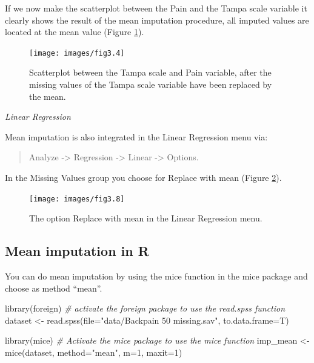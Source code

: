 \documentclass[
]{book}
\newenvironment{Shaded}{\begin{snugshade}}{\end{snugshade}}
\newcommand{\AttributeTok}[1]{\textcolor[rgb]{0.77,0.63,0.00}{#1}}
\newcommand{\CommentTok}[1]{\textcolor[rgb]{0.56,0.35,0.01}{\textit{#1}}}
\newcommand{\DecValTok}[1]{\textcolor[rgb]{0.00,0.00,0.81}{#1}}
\newcommand{\FunctionTok}[1]{\textcolor[rgb]{0.00,0.00,0.00}{#1}}
\newcommand{\NormalTok}[1]{#1}
\newcommand{\OtherTok}[1]{\textcolor[rgb]{0.56,0.35,0.01}{#1}}
\newcommand{\StringTok}[1]{\textcolor[rgb]{0.31,0.60,0.02}{#1}}
\begin{document}
If we now make the scatterplot between the Pain and the Tampa scale variable it clearly shows the result of the mean imputation procedure, all imputed values are located at the mean value (Figure \ref{fig:fig3-4}).

\begin{figure}

{\centering \texttt{[image: images/fig3.4]} 

}

\caption{Scatterplot between the Tampa scale and Pain variable, after the missing values of the Tampa scale variable have been replaced by the mean.}\label{fig:fig3-4}
\end{figure}

\emph{Linear Regression}

Mean imputation is also integrated in the Linear Regression menu via:

\begin{quote}
Analyze -\textgreater{} Regression -\textgreater{} Linear -\textgreater{} Options.
\end{quote}

In the Missing Values group you choose for Replace with mean (Figure \ref{fig:fig3-8}).

\begin{figure}

{\centering \texttt{[image: images/fig3.8]} 

}

\caption{The option Replace with mean in the Linear Regression menu.}\label{fig:fig3-8}
\end{figure}

\hypertarget{mean-imputation-in-r}{%
\subsection{Mean imputation in R}\label{mean-imputation-in-r}}

You can do mean imputation by using the mice function in the mice package and choose as method ``mean''.

\begin{Shaded}
\begin{Highlighting}[]
\FunctionTok{library}\NormalTok{(foreign) }\CommentTok{\# activate the foreign package to use the read.spss function}
\NormalTok{dataset }\OtherTok{\textless{}{-}} \FunctionTok{read.spss}\NormalTok{(}\AttributeTok{file=}\StringTok{"data/Backpain 50 missing.sav"}\NormalTok{, }\AttributeTok{to.data.frame=}\NormalTok{T)}

\FunctionTok{library}\NormalTok{(mice) }\CommentTok{\# Activate the mice package to use the mice function}
\NormalTok{imp\_mean }\OtherTok{\textless{}{-}} \FunctionTok{mice}\NormalTok{(dataset, }\AttributeTok{method=}\StringTok{"mean"}\NormalTok{, }\AttributeTok{m=}\DecValTok{1}\NormalTok{, }\AttributeTok{maxit=}\DecValTok{1}\NormalTok{)}
\end{Highlighting}
\end{Shaded}
\end{document}
